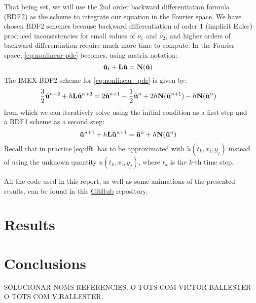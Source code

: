 \documentclass[twoside]{article}
\begin{document}
That being set, we will use the 2nd order backward differentiation formula (BDF2) as the scheme to integrate our equation in the Fourier space. We have chosen BDF2 schemes because backward differentiation of order 1 (implicit Euler) produced inconsistencies for small values of $\nu_1$ and $\nu_2$, and higher orders of backward differentiation require much more time to compute. In the Fourier space, \cref{eq:nonlinear-pde} becomes, using matrix notation:
\begin{equation}
  \boldsymbol{\mathrm{\tilde{u}}}_t+\boldsymbol{\mathrm{L}}\boldsymbol{\mathrm{\tilde{u}}}=\boldsymbol{\mathrm{N}}(\boldsymbol{\mathrm{\tilde{u}}})
\end{equation}
The IMEX-BDF2 scheme for \cref{eq:nonlinear_pde} is given by:
\begin{equation}
  \frac{3}{2} \boldsymbol{\mathrm{\tilde{u}}}^{n+2} +h \boldsymbol{\mathrm{L}} \boldsymbol{\mathrm{\tilde{u}}}^{n+2} = 2 \boldsymbol{\mathrm{\tilde{u}}}^{n+1} - \frac{1}{2} \boldsymbol{\mathrm{\tilde{u}}}^{n} + 2h \boldsymbol{\mathrm{N}}(\boldsymbol{\mathrm{\tilde{u}}}^{n+1}) -  h \boldsymbol{\mathrm{N}}(\boldsymbol{\mathrm{\tilde{u}}}^{n})
\end{equation}
from which we can iteratively solve using the initial condition as a first step and a BDF1 scheme as a second step:
\begin{equation}
  \boldsymbol{\mathrm{\tilde{u}}}^{n+1} + h \boldsymbol{\mathrm{L}} \boldsymbol{\mathrm{\tilde{u}}}^{n+1} = \boldsymbol{\mathrm{\tilde{u}}}^{n} + h \boldsymbol{\mathrm{N}}(\boldsymbol{\mathrm{\tilde{u}}}^{n})
\end{equation}
Recall that in practice \cref{eq:dft} has to be approximated with $\tilde{u}(t_k,x_i,y_j)$ instead of using the unknown quantity $u(t_k,x_i,y_j)$, where $t_k$ is the $k$-th time step.

All the code used in this report, as well as some animations of the presented results, can be found in this \href{https://github.com/victorballester7/2d-kuramoto-sivashinsky}{GitHub} repository.
\section{Results}
\section{Conclusions}

{}
\printbibliography
SOLUCIONAR NOMS REFERENCIES. O TOTS COM VICTOR BALLESTER O TOTS COM V.BALLESTER.
\end{document}
